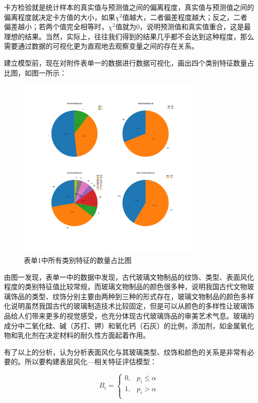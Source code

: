 \documentclass[withoutpreface,bwprint]{cumcmthesis}%
\begin{document}
	卡方检验就是统计样本的真实值与预测值之间的偏离程度，真实值与预测值之间的偏离程度就决定卡方值的大小，如果$\chi^{2}$值越大，二者偏差程度越大；反之，二者偏差越小；若两个值完全相等时，$\chi^{2}$值就为0，说明预测值和真实值重合，这是最理想的结果。当然，实际上，往往我们得到的结果几乎都不会达到这种程度，那么需要通过数据的可视化更为直观地去观察变量之间的存在关系。
	
	建立模型前，现在对附件表单一的数据进行数据可视化，画出四个类别特征数量占比图，如图一所示：
	\begin{figure}[!h]
		\centering
		\includegraphics[width=0.8\textwidth]{ph1}
		\caption{表单1中所有类别特征的数量占比图}
		\label{fig:ph1}
	\end{figure}
	
	由图一发现，表单一中的数据中发现，古代玻璃文物制品的纹饰、类型、表面风化程度的类别特征值比较常规，而玻璃文物制品的颜色很多种，说明我国古代文物玻璃饰品的类型、纹饰分别主要由两种到三种的形式存在，玻璃文物制品的颜色多样化说明虽然我国古代的玻璃制造技术比较固定，但是可以从颜色的多样性让玻璃饰品给人们带来更多的视觉感受，也充分体现古代玻璃饰品的审美艺术气息。玻璃的成分中二氧化硅、碱（苏打、钾）和氧化钙（石灰）的比例，添加剂，如金属氧化物和乳化剂在决定材料的耐久性方面起着作用。
	
	有了以上的分析，认为分析表面风化与其玻璃类型、纹饰和颜色的关系是非常有必要的。所以要构建表层风化—相关特征评估模型：
	
	\begin{equation}
		B_{i} = \begin{cases}
			0, & p_{i} \leq \alpha\\
			1, & p_{i} > \alpha \\
		\end{cases}
	\end{equation}
\end{document}
